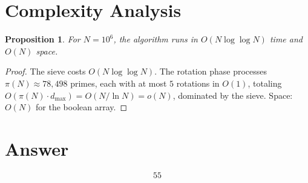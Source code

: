 \documentclass[12pt]{article}
\newtheorem{proposition}[theorem]{Proposition}
\theoremstyle{definition}
\begin{document}
\section{Complexity Analysis}

\begin{proposition}
For $N = 10^6$, the algorithm runs in $O(N \log \log N)$ time and $O(N)$ space.
\end{proposition}

\begin{proof}
The sieve costs $O(N \log \log N)$. The rotation phase processes $\pi(N) \approx 78{,}498$ primes, each with at most $5$ rotations in $O(1)$, totaling $O(\pi(N) \cdot d_{\max}) = O(N/\ln N) = o(N)$, dominated by the sieve. Space: $O(N)$ for the boolean array.
\end{proof}

\section{Answer}

\[
\boxed{55}
\]
\end{document}
